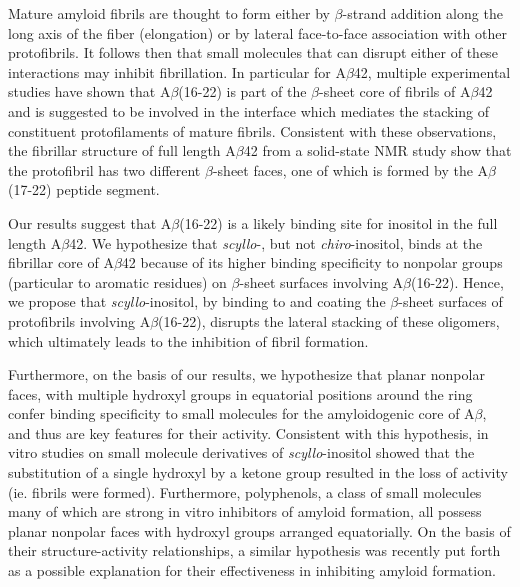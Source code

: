 Mature amyloid fibrils are thought to form either by $\beta$-strand addition along the long axis of the fiber (elongation) or by lateral face-to-face association with other protofibrils.\cite{Straub:2011p174} It follows then that small molecules that can disrupt either of these interactions may inhibit fibrillation. In particular for A$\beta$42, multiple experimental studies have shown that A$\beta$(16-22) is part of the $\beta$-sheet core of fibrils of A$\beta$42\cite{Hilbich:1992vy,Gordon:2001tj,Soto:2007tm,Watanabe:2002ti,Inouye:1993ku} and is suggested to be involved in the interface which mediates the stacking of constituent protofilaments of mature fibrils.\cite{Petkova:2002p192,Petkova:2006p48,Paravastu:2006p218,Luhrs:2005p229} Consistent with these observations, the fibrillar structure of full length A$\beta$42 from a solid-state NMR study show that the protofibril has two different $\beta$-sheet faces, one of which is formed by the A$\beta$(17-22) peptide segment.\cite{Luhrs:2005p229}


Our results suggest that A$\beta$(16-22) is a likely binding site for inositol in the full length A$\beta$42.  We hypothesize that \emph{scyllo}-, but not \emph{chiro}-inositol, binds at the fibrillar core of A$\beta$42 because of its higher binding specificity to nonpolar groups (particular to aromatic residues) on $\beta$-sheet surfaces involving A$\beta$(16-22). Hence, we propose that \emph{scyllo}-inositol, by binding to and coating the $\beta$-sheet surfaces of protofibrils involving A$\beta$(16-22), disrupts the lateral stacking of these oligomers, which ultimately leads to the inhibition of fibril formation.

Furthermore, on the basis of our results, we hypothesize that planar nonpolar faces, with multiple hydroxyl groups in equatorial positions around the ring confer binding specificity to small molecules for the amyloidogenic core of A$\beta$, and thus are key features for their activity. Consistent with this hypothesis, in vitro studies on small molecule derivatives of \emph{scyllo}-inositol showed that the substitution of a single hydroxyl by a ketone group resulted in the loss of activity (ie. fibrils were formed).\cite{Nitz:2008p13,Sun:2008p208,McLaurin:2000p64} Furthermore, polyphenols, a class of small molecules many of which are strong in vitro inhibitors of amyloid formation, all possess planar nonpolar faces with hydroxyl groups arranged equatorially. On the basis of their structure-activity relationships, a similar hypothesis was recently put forth as a possible explanation for their effectiveness in inhibiting amyloid formation. \cite{Porat:2006p33}

